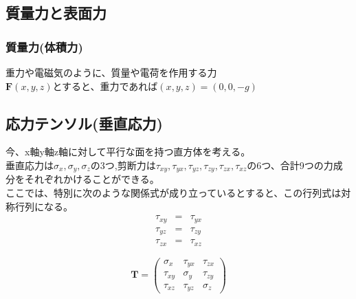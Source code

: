 \documentclass[a4j,twoside,openright,11pt]{jsarticle}
\begin{document}
\subsection{質量力と表面力}

\subsubsection{質量力(体積力)}
重力や電磁気のように、質量や電荷を作用する力\\
$\bm{F}(x,y,z)$とすると、重力であれば$(x,y,z)=(0,0,-g)$
\subsection{応力テンソル(垂直応力)}
今、x軸y軸z軸に対して平行な面を持つ直方体を考える。\\
垂直応力は$\sigma_x,\sigma_y,\sigma_z$の3つ,剪断力は$\tau_{xy},\tau_{yx},\tau_{yz},\tau_{zy},\tau_{zx},\tau_{xz}$の6つ、合計9つの力成分をそれぞれかけることができる。\\
ここでは、特別に次のような関係式が成り立っているとすると、この行列式は対称行列になる。
\begin{eqnarray}
\tau_{xy}&=&\tau_{yx}\nonumber\\
\tau_{yz}&=&\tau_{zy}\nonumber\\
\tau_{zx}&=&\tau_{xz}\nonumber
\end{eqnarray}

\begin{equation}
\bm{T}=
\begin{pmatrix}
\sigma_x & \tau_{yx}   & \tau_{zx}\\
\tau_{xy} & \sigma_{y} &\tau_{zy}\\
\tau_{xz}& \tau_{yz}&\sigma_{z}
\end{pmatrix}
\end{equation}
\end{document}
